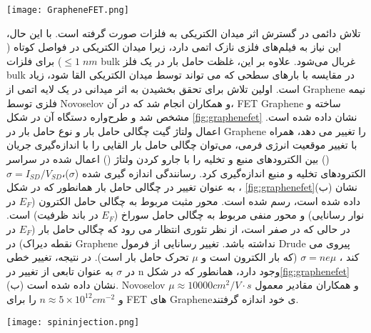 
\begin{figure*}[!ht]
    \centering
    \texttt{[image: GrapheneFET.png]}
    \caption{(الف). طرح‌واره دستگاه یک  با کانال گرافین بین الکترودهای منبع و تخلیه و یک گیت پشتی. (ب). طرحی از رسانندگی حامل بار ($\sigma$) گرافین  که تابعی از چگالی حامل بار  ترسیم شده است. نمودار درونی – نواری گرافین با انرژی فرمی، $E_F$.}
    \label{fig:graphenefet}
\end{figure*}
تلاش دائمی در گسترش اثر میدان الکتریکی به فلزات صورت گرفته است. با این حال، این نیاز به فیلم‌های فلزی نازک اتمی دارد، زیرا میدان الکتریکی در فواصل کوتاه ($\le1\;nm$) برای فلزات \gls{bulk} غربال می‌شود. علاوه بر این، غلظت حامل بار در یک فلز \gls{bulk} در مقایسه با بارهای سطحی که می تواند توسط میدان الکتریکی القا شود، زیاد است. اولین تلاش برای تحقق بخشیدن به اثر میدانی در یک لایه اتمی از \gls{Graphene} نیمه فلزی توسط \gls{Novoselov} و همکاران\cite{novoselov2004electric} انجام شد که در آن، \gls{FET} \gls{Graphene} ساخته و مشخص شد و طرح‌واره دستگاه آن در شکل \ref{fig:graphenefet} نشان داده شده است. اعمال ولتاژ گیت  چگالی حامل بار  و نوع حامل بار در \gls{Graphene} را تغییر می دهد، همراه با تغییر موقعیت انرژی فرمی، می‌توان چگالی حامل بار القایی را با اندازه‌گیری جریان () بین الکترودهای منبع و تخلیه را با جارو کردن ولتاژ () اعمال شده در سراسر الکترودهای تخلیه و منبع اندازه‌گیری کرد. رسانندگی اندازه گیری شده ($\sigma$)،$\sigma = I_{SD}/V_{SD}$، به عنوان تغییر در چگالی حامل بار همانطور که در شکل \ref{fig:graphenefet}(ب) نشان داده شده است، رسم شده است. محور مثبت  مربوط به چگالی حامل الکترون ($E_F$ در نوار رسانایی) و محور منفی  مربوط به چگالی حامل سوراخ ($E_F$ در باند ظرفیت) است. در حالی که در صفر است، از نظر تئوری انتظار می رود که چگالی حامل بار ($E_F$ در نقطه دیراک) در \gls{Graphene} نداشته باشد. تغییر رسانایی از فرمول \gls{Drude} پیروی می کند \cite{novoselov2004electric}، $\sigma = ne\mu$ (که  بار الکترون است و $\mu$ تحرک حامل بار است). در نتیجه، تغییر خطی در $\sigma$ به عنوان تابعی از تغییر در n وجود دارد، همانطور که در شکل\ref{fig:graphenefet}(ب) نشان داده شده است. \gls{Novoselov} و همکاران \cite{novoselov2004electric} مقادیر معمول $\mu \approx 10000 cm^2/V·s$ و $n \approx 5 \times 10^{12} cm^{-2}$ را برای \gls{FET} های \gls{Graphene}ی خود اندازه گرفتند.
\begin{figure*}[!ht]
    \centering
    \texttt{[image: spininjection.png]}
    \caption{تزریق اسپین از یک فرومغناطیس  به یک غیر آهنربا  همانطور که در قسمت سمت چپ شکل نشان داده شده است. پتانسیل شیمیایی اسپین در ، رابط )بین  و (، و بخش عمده  در مرکز نشان داده شده است. فروپاشی نمایی انباشت اسپین القایی از رابط به بخش عمده  در قسمت سمت راست شکل نشان داده شده است.}
    \label{fig:spininjection}
\end{figure*}
